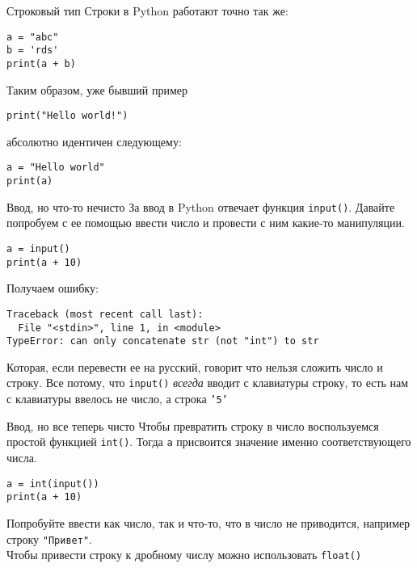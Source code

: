 \documentclass[hyperref=unicode, aspectratio=169]{beamer}
\begin{document}
\begin{frame}[fragile]{Строковый тип}
    Строки в Python работают точно так же:
    \begin{example}
        \begin{verbatim}
a = "abc"
b = 'rds'
print(a + b)
        \end{verbatim}    
    \end{example}
    
    Таким образом, уже бывший пример
    \begin{verbatim}
print("Hello world!")
    \end{verbatim}
    абсолютно идентичен следующему:
    \begin{verbatim}
a = "Hello world"
print(a)
    \end{verbatim}
\end{frame}

\begin{frame}[fragile]{Ввод, но что-то нечисто}
    За ввод в Python отвечает функция \texttt{input()}. Давайте попробуем с ее помощью ввести число и провести с ним какие-то манипуляции.
    \begin{example}
        \begin{verbatim}
a = input()
print(a + 10)
        \end{verbatim}
    \end{example}
    Получаем ошибку:
    \begin{verbatim}
Traceback (most recent call last):
  File "<stdin>", line 1, in <module>
TypeError: can only concatenate str (not "int") to str
    \end{verbatim}
    Которая, если перевести ее на русский, говорит что нельзя сложить число и строку. Все потому, что \texttt{input()} \textit{всегда} вводит с клавиатуры строку, то есть нам с клавиатуры ввелось не число, а строка \texttt{'5'}
\end{frame}

\begin{frame}[fragile]{Ввод, но все теперь чисто}
    Чтобы превратить строку в число воспользуемся простой функцией \texttt{int()}. Тогда \texttt{a} присвоится значение именно соответствующего числа.
    \begin{example}
        \begin{verbatim}
a = int(input())
print(a + 10)
        \end{verbatim}    
    \end{example}
    Попробуйте ввести как число, так и что-то, что в число не приводится, например строку \texttt{"Привет"}. \\
    Чтобы привести строку к дробному числу можно использовать \texttt{float()}
\end{frame}
\end{document}

